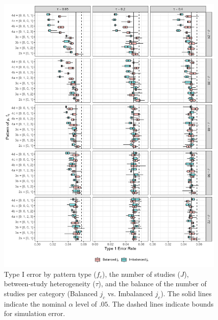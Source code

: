\begin{figure}
    \centering
    \vspace{-5pt}\includegraphics[width=\linewidth]{chapters/plots/type1error_bal_tau.png}\caption{Type I error by pattern type ($f_c$), the number of studies ($J$), between-study heterogeneity ($\tau$), and the balance of the number of studies per category (Balanced $j_c$ vs. Imbalanced $j_c$). The solid lines indicate the nominal $\alpha$ level of $.05$. The dashed lines indicate bounds for simulation error. \label{fig: type1error_bal_tau}}
    \vspace{-5pt}
\end{figure}







